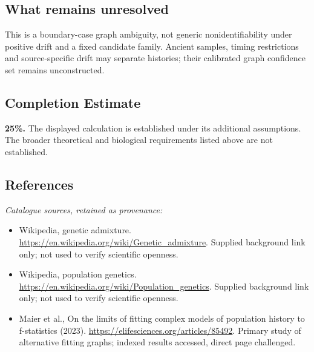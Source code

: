\documentclass[11pt]{article}
\begin{document}
\subsection{What remains unresolved}
This is a boundary-case graph ambiguity, not generic nonidentifiability under positive drift and a fixed candidate family. Ancient samples, timing restrictions and source-specific drift may separate histories; their calibrated graph confidence set remains unconstructed.
\subsection{Completion Estimate}
\textbf{25\%.} The displayed calculation is established under its additional assumptions. The broader theoretical and biological requirements listed above are not established.
\subsection{References}
\noindent\emph{Catalogue sources, retained as provenance:}
\begin{itemize}
\item Wikipedia, genetic admixture. \url{https://en.wikipedia.org/wiki/Genetic_admixture}. Supplied background link only; not used to verify scientific openness.
\item Wikipedia, population genetics. \url{https://en.wikipedia.org/wiki/Population_genetics}. Supplied background link only; not used to verify scientific openness.
\item Maier et al., On the limits of fitting complex models of population history to f-statistics (2023). \url{https://elifesciences.org/articles/85492}. Primary study of alternative fitting graphs; indexed results accessed, direct page challenged.
\end{itemize}
\clearpage


\appendix
\end{document}
